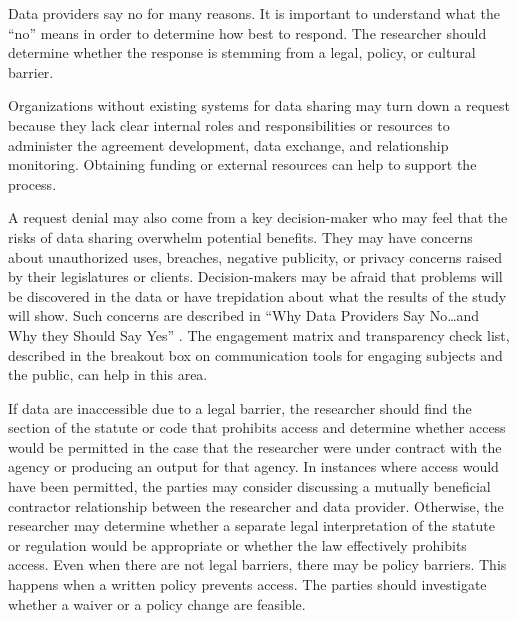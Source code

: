 Data providers say no for many reasons. It is important to understand what the ``no'' means in order to determine how best to respond. The researcher should determine whether the response is stemming from a legal, policy, or cultural barrier.

Organizations without existing systems for data sharing may turn down a request because they lack clear internal roles and responsibilities or resources to administer the agreement development, data exchange, and relationship monitoring. Obtaining funding or external resources can help to support the process.

A request denial may also come from a key decision-maker who may feel that the risks of data sharing overwhelm potential benefits. They may have concerns about unauthorized uses, breaches, negative publicity, or privacy concerns raised by their legislatures or clients. Decision-makers may be afraid that problems will be discovered in the data or have trepidation about what the results of the study will show. Such concerns are described in ``Why Data Providers Say No\ldots{}and Why they Should Say Yes'' \citep{nationalneighborhoodindicatorspartnership2018}. The engagement matrix and transparency check list, described in the breakout box on communication tools for engaging subjects and the public, can help in this area.

If data are inaccessible due to a legal barrier, the researcher should find the section of the statute or code that prohibits access and determine whether access would be permitted in the case that the researcher were under contract with the agency or producing an output for that agency. In instances where access would have been permitted, the parties may consider discussing a mutually beneficial contractor relationship between the researcher and data provider. Otherwise, the researcher may determine whether a separate legal interpretation of the statute or regulation would be appropriate or whether the law effectively prohibits access. Even when there are not legal barriers, there may be policy barriers. This happens when a written policy prevents access. The parties should investigate whether a waiver or a policy change are feasible.

